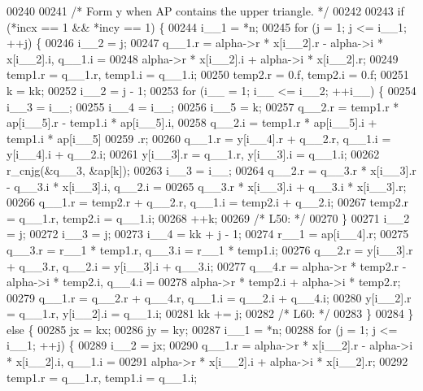\begin{DoxyCode}
00240 
00241 \textcolor{comment}{/*        Form  y  when AP contains the upper triangle. */}
00242 
00243     \textcolor{keywordflow}{if} (*incx == 1 && *incy == 1) \{
00244         i\_\_1 = *n;
00245         \textcolor{keywordflow}{for} (j = 1; j <= i\_\_1; ++j) \{
00246         i\_\_2 = j;
00247         q\_\_1.r = alpha->r * x[i\_\_2].r - alpha->i * x[i\_\_2].i, q\_\_1.i =
00248              alpha->r * x[i\_\_2].i + alpha->i * x[i\_\_2].r;
00249         temp1.r = q\_\_1.r, temp1.i = q\_\_1.i;
00250         temp2.r = 0.f, temp2.i = 0.f;
00251         k = kk;
00252         i\_\_2 = j - 1;
00253         \textcolor{keywordflow}{for} (i\_\_ = 1; i\_\_ <= i\_\_2; ++i\_\_) \{
00254             i\_\_3 = i\_\_;
00255             i\_\_4 = i\_\_;
00256             i\_\_5 = k;
00257             q\_\_2.r = temp1.r * ap[i\_\_5].r - temp1.i * ap[i\_\_5].i, 
00258                 q\_\_2.i = temp1.r * ap[i\_\_5].i + temp1.i * ap[i\_\_5]
00259                 .r;
00260             q\_\_1.r = y[i\_\_4].r + q\_\_2.r, q\_\_1.i = y[i\_\_4].i + q\_\_2.i;
00261             y[i\_\_3].r = q\_\_1.r, y[i\_\_3].i = q\_\_1.i;
00262             r\_cnjg(&q\_\_3, &ap[k]);
00263             i\_\_3 = i\_\_;
00264             q\_\_2.r = q\_\_3.r * x[i\_\_3].r - q\_\_3.i * x[i\_\_3].i, q\_\_2.i =
00265                  q\_\_3.r * x[i\_\_3].i + q\_\_3.i * x[i\_\_3].r;
00266             q\_\_1.r = temp2.r + q\_\_2.r, q\_\_1.i = temp2.i + q\_\_2.i;
00267             temp2.r = q\_\_1.r, temp2.i = q\_\_1.i;
00268             ++k;
00269 \textcolor{comment}{/* L50: */}
00270         \}
00271         i\_\_2 = j;
00272         i\_\_3 = j;
00273         i\_\_4 = kk + j - 1;
00274         r\_\_1 = ap[i\_\_4].r;
00275         q\_\_3.r = r\_\_1 * temp1.r, q\_\_3.i = r\_\_1 * temp1.i;
00276         q\_\_2.r = y[i\_\_3].r + q\_\_3.r, q\_\_2.i = y[i\_\_3].i + q\_\_3.i;
00277         q\_\_4.r = alpha->r * temp2.r - alpha->i * temp2.i, q\_\_4.i = 
00278             alpha->r * temp2.i + alpha->i * temp2.r;
00279         q\_\_1.r = q\_\_2.r + q\_\_4.r, q\_\_1.i = q\_\_2.i + q\_\_4.i;
00280         y[i\_\_2].r = q\_\_1.r, y[i\_\_2].i = q\_\_1.i;
00281         kk += j;
00282 \textcolor{comment}{/* L60: */}
00283         \}
00284     \} \textcolor{keywordflow}{else} \{
00285         jx = kx;
00286         jy = ky;
00287         i\_\_1 = *n;
00288         \textcolor{keywordflow}{for} (j = 1; j <= i\_\_1; ++j) \{
00289         i\_\_2 = jx;
00290         q\_\_1.r = alpha->r * x[i\_\_2].r - alpha->i * x[i\_\_2].i, q\_\_1.i =
00291              alpha->r * x[i\_\_2].i + alpha->i * x[i\_\_2].r;
00292         temp1.r = q\_\_1.r, temp1.i = q\_\_1.i;

\end{DoxyCode}
